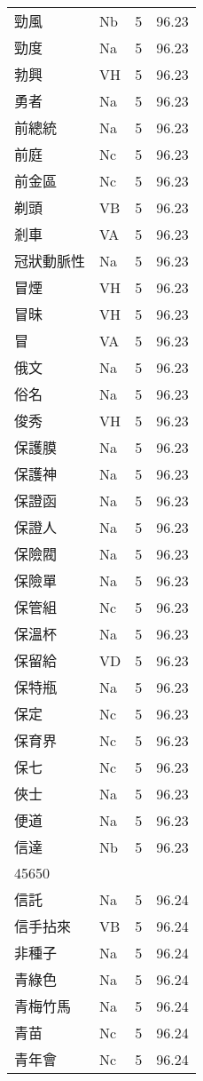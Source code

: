\documentclass[twocolumn]{book}
\begin{document}
\begin{supertabular}{llrr}
勁風 & Nb & 5 &  96.23\\
勁度 & Na & 5 &  96.23\\
勃興 & VH & 5 &  96.23\\
勇者 & Na & 5 &  96.23\\
前總統 & Na & 5 &  96.23\\
前庭 & Nc & 5 &  96.23\\
前金區 & Nc & 5 &  96.23\\
剃頭 & VB & 5 &  96.23\\
剎車 & VA & 5 &  96.23\\
冠狀動脈性 & Na & 5 &  96.23\\
冒煙 & VH & 5 &  96.23\\
冒昧 & VH & 5 &  96.23\\
冒 & VA & 5 &  96.23\\
俄文 & Na & 5 &  96.23\\
俗名 & Na & 5 &  96.23\\
俊秀 & VH & 5 &  96.23\\
保護膜 & Na & 5 &  96.23\\
保護神 & Na & 5 &  96.23\\
保證函 & Na & 5 &  96.23\\
保證人 & Na & 5 &  96.23\\
保險閥 & Na & 5 &  96.23\\
保險單 & Na & 5 &  96.23\\
保管組 & Nc & 5 &  96.23\\
保溫杯 & Na & 5 &  96.23\\
保留給 & VD & 5 &  96.23\\
保特瓶 & Na & 5 &  96.23\\
保定 & Nc & 5 &  96.23\\
保育界 & Nc & 5 &  96.23\\
保七 & Nc & 5 &  96.23\\
俠士 & Na & 5 &  96.23\\
便道 & Na & 5 &  96.23\\
信達 & Nb & 5 &  96.23\\
45650\\
信託 & Na & 5 &  96.24\\
信手拈來 & VB & 5 &  96.24\\
非種子 & Na & 5 &  96.24\\
青綠色 & Na & 5 &  96.24\\
青梅竹馬 & Na & 5 &  96.24\\
青苗 & Nc & 5 &  96.24\\
青年會 & Nc & 5 &  96.24\\

\end{supertabular}
\end{document}
